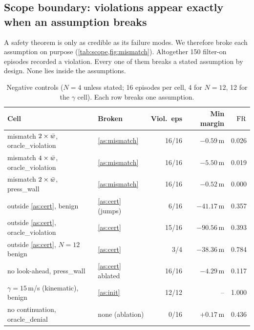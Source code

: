 \subsection{Scope boundary: violations appear exactly when an assumption breaks}\label{sec:scope}
A safety theorem is only as credible as its failure modes. We therefore
broke each assumption on purpose (\cref{tab:scope,fig:mismatch}).
Altogether 150 filter-on episodes recorded a violation. Every one of them
breaks a stated assumption by design. None lies inside the assumptions.

\begin{table}[t]
\centering\scriptsize
\caption{Negative controls ($N=4$ unless stated; 16 episodes per cell, 4
for $N=12$, 12 for the $\gamma$ cell). Each row breaks one assumption.}
\label{tab:scope}
\setlength{\tabcolsep}{2.4pt}
\begin{tabular}{@{}llrrr@{}}
\toprule
Cell & Broken & Viol.\ eps & Min margin & $\mathrm{FR}$\\
\midrule
mismatch $2\times\bar w$, oracle\_violation & \ref{as:mismatch} & 16/16 & $-0.59$\,m & 0.026\\
mismatch $4\times\bar w$, oracle\_violation & \ref{as:mismatch} & 16/16 & $-5.50$\,m & 0.019\\
mismatch $2\times\bar w$, press\_wall & \ref{as:mismatch} & 16/16 & $-0.52$\,m & 0.000\\
outside \ref{as:cert}, benign & \ref{as:cert} (jumps) & 6/16 & $-41.17$\,m & 0.357\\
outside \ref{as:cert}, oracle\_violation & \ref{as:cert} & 15/16 & $-90.56$\,m & 0.393\\
outside \ref{as:cert}, $N{=}12$ benign & \ref{as:cert} & 3/4 & $-38.36$\,m & 0.784\\
no look-ahead, press\_wall & \ref{as:cert} ablated & 16/16 & $-4.29$\,m & 0.117\\
$\gamma=15$\,m/s (kinematic), benign & \ref{as:init} & 12/12 & -- & 1.000\\
\midrule
no continuation, oracle\_denial & none (ablation) & 0/16 & $+0.17$\,m & 0.436\\
\bottomrule
\end{tabular}
\end{table}

